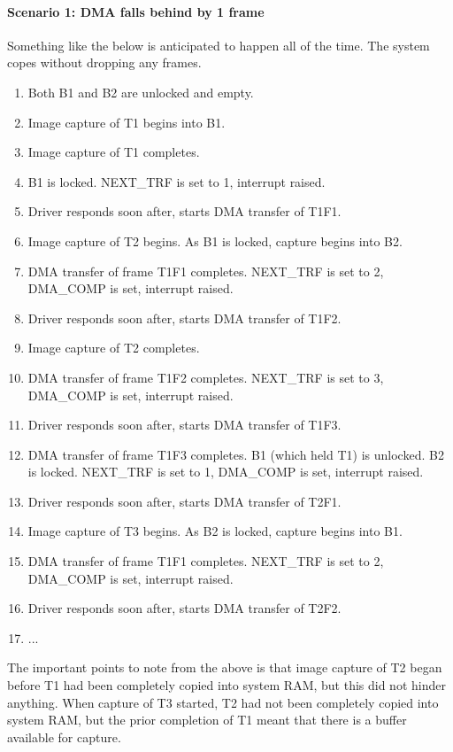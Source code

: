 \documentclass[12pt]{article}
\begin{document}
\paragraph{Scenario 1: DMA falls behind by 1 frame}
Something like the below is anticipated to happen all of the time. The system copes without dropping any frames.

\begin{enumerate}
\item Both B1 and B2 are unlocked and empty.
\item Image capture of T1 begins into B1.
\item Image capture of T1 completes.
\item B1 is locked. NEXT\_TRF is set to 1, interrupt raised.
\item Driver responds soon after, starts DMA transfer of T1F1.
\item Image capture of T2 begins. As B1 is locked, capture begins into B2.
\item DMA transfer of frame T1F1 completes. NEXT\_TRF is set to 2, DMA\_COMP is set, interrupt raised.
\item Driver responds soon after, starts DMA transfer of T1F2.
\item Image capture of T2 completes.
\item DMA transfer of frame T1F2 completes. NEXT\_TRF is set to 3, DMA\_COMP is set, interrupt raised.
\item Driver responds soon after, starts DMA transfer of T1F3.
\item DMA transfer of frame T1F3 completes. B1 (which held T1) is unlocked. B2 is locked. NEXT\_TRF is set to 1, DMA\_COMP is set, interrupt raised.
\item Driver responds soon after, starts DMA transfer of T2F1.
\item Image capture of T3 begins. As B2 is locked, capture begins into B1.
\item DMA transfer of frame T1F1 completes. NEXT\_TRF is set to 2, DMA\_COMP is set, interrupt raised.
\item Driver responds soon after, starts DMA transfer of T2F2.
\item ...
\end{enumerate}

The important points to note from the above is that image capture of T2 began before T1 had been completely copied into system RAM, but this did not hinder anything. When capture of T3 started, T2 had not been completely copied into system RAM, but the prior completion of T1 meant that there is a buffer available for capture.
\end{document}
